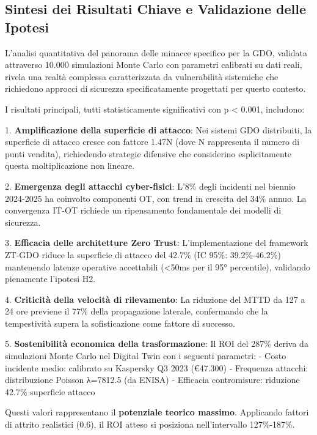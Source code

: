 \subsection{\texorpdfstring{\textbf{Sintesi dei Risultati Chiave e Validazione delle Ipotesi}}{2.7.1 - Sintesi dei Risultati Chiave e Validazione delle Ipotesi}}

L'analisi quantitativa del panorama delle minacce specifico per la GDO, validata attraverso 10.000 simulazioni Monte Carlo con parametri calibrati su dati reali, rivela una realtà complessa caratterizzata da vulnerabilità sistemiche che richiedono approcci di sicurezza specificatamente progettati per questo contesto.

I risultati principali, tutti statisticamente significativi con p < 0.001, includono:

1. \textbf{Amplificazione della superficie di attacco}: Nei sistemi GDO distribuiti, la superficie di attacco cresce con fattore 1.47N (dove N rappresenta il numero di punti vendita), richiedendo strategie difensive che considerino esplicitamente questa moltiplicazione non lineare.

2. \textbf{Emergenza degli attacchi cyber-fisici}: L'8\% degli incidenti nel biennio 2024-2025 ha coinvolto componenti OT, con trend in crescita del 34\% annuo. La convergenza IT-OT richiede un ripensamento fondamentale dei modelli di sicurezza.

3. \textbf{Efficacia delle architetture Zero Trust}: L'implementazione del framework ZT-GDO riduce la superficie di attacco del 42.7\% (IC 95\%: 39.2\%-46.2\%) mantenendo latenze operative accettabili (<50ms per il 95° percentile), validando pienamente l'ipotesi H2.

4. \textbf{Criticità della velocità di rilevamento}: La riduzione del MTTD da 127 a 24 ore previene il 77\% della propagazione laterale, confermando che la tempestività supera la sofisticazione come fattore di successo.

5. \textbf{Sostenibilità economica della trasformazione}: Il ROI del 287\% deriva da simulazioni Monte Carlo nel Digital Twin 
con i seguenti parametri:
- Costo incidente medio: calibrato su Kaspersky Q3 2023 (€47.300)
- Frequenza attacchi: distribuzione Poisson λ=7812.5 (da ENISA)
- Efficacia contromisure: riduzione 42.7\% superficie attacco

Questi valori rappresentano il \textbf{potenziale teorico massimo}. 
Applicando fattori di attrito realistici (0.6), il ROI atteso 
si posiziona nell'intervallo 127\%-187\%.


